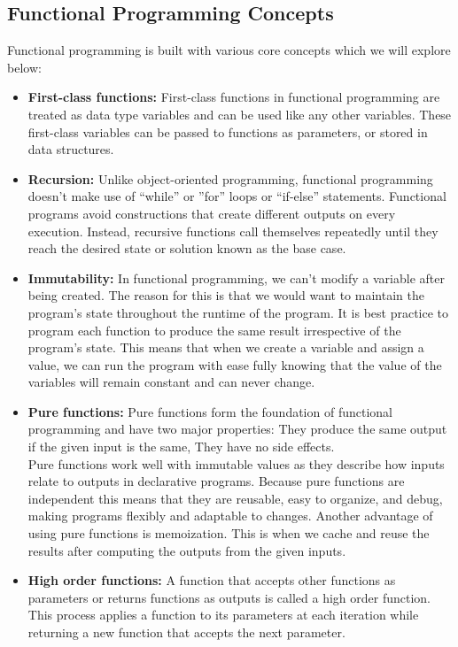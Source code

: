 \documentclass[12pt]{article}
\begin{document}
\subsection{Functional Programming Concepts}
Functional programming is built with various core concepts which we will explore below:
\begin{itemize}
    \item \textbf{First-class functions:} First-class functions in functional programming are treated as data type variables and can be used like any other variables. These first-class variables can be passed to functions as parameters, or stored in data structures.
    \item \textbf{Recursion:} Unlike object-oriented programming, functional programming doesn’t make use of “while” or ”for” loops or “if-else” statements. Functional programs avoid constructions that create different outputs on every execution. Instead, recursive functions call themselves repeatedly until they reach the desired state or solution known as the base case.
    \item \textbf{Immutability:} In functional programming, we can’t modify a variable after being created. The reason for this is that we would want to maintain the program's state throughout the runtime of the program. It is best practice to program each function to produce the same result irrespective of the program's state. This means that when we create a variable and assign a value, we can run the program with ease fully knowing that the value of the variables will remain constant and can never change.
    \item \textbf{Pure functions:} Pure functions form the foundation of functional programming and have two major properties: They produce the same output if the given input is the same, They have no side effects.\\
    Pure functions work well with immutable values as they describe how inputs relate to outputs in declarative programs. Because pure functions are independent this means that they are reusable, easy to organize, and debug, making programs flexibly and adaptable to changes. Another advantage of using pure functions is memoization. This is when we cache and reuse the results after computing the outputs from the given inputs.
    \item \textbf{High order functions:} A function that accepts other functions as parameters or returns functions as outputs is called a high order function. This process applies a function to its parameters at each iteration while returning a new function that accepts the next parameter.
\end{itemize}
\end{document}
